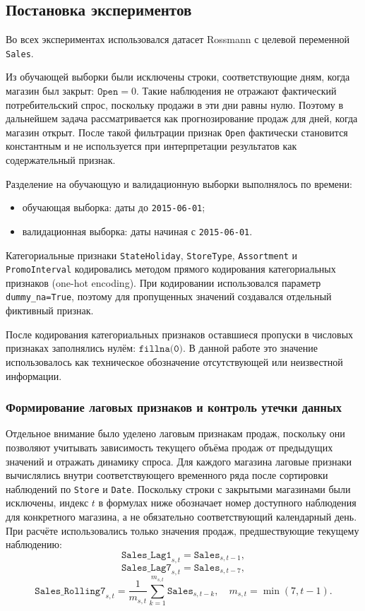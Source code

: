 \documentclass[12pt,a4paper]{article}
\numberwithin{equation}{section}
\begin{document}
\subsection{Постановка экспериментов}

Во всех экспериментах использовался датасет Rossmann с целевой переменной \texttt{Sales}.

Из обучающей выборки были исключены строки, соответствующие дням, когда магазин был закрыт: \(\texttt{Open} = 0\). Такие наблюдения не отражают фактический потребительский спрос, поскольку продажи в эти дни равны нулю. Поэтому в дальнейшем задача рассматривается как прогнозирование продаж для дней, когда магазин открыт. После такой фильтрации признак \texttt{Open} фактически становится константным и не используется при интерпретации результатов как содержательный признак.

Разделение на обучающую и валидационную выборки выполнялось по времени:

\begin{itemize}
    \item обучающая выборка: даты до \texttt{2015-06-01};
    \item валидационная выборка: даты начиная с \texttt{2015-06-01}.
\end{itemize}

Категориальные признаки \texttt{StateHoliday}, \texttt{StoreType}, \texttt{Assortment} и \texttt{PromoInterval} кодировались методом прямого кодирования категориальных признаков (one-hot encoding). При кодировании использовался параметр \texttt{dummy\_na=True}, поэтому для пропущенных значений создавался отдельный фиктивный признак.

После кодирования категориальных признаков оставшиеся пропуски в числовых признаках заполнялись нулём: \(\texttt{fillna(0)}\). В данной работе это значение использовалось как техническое обозначение отсутствующей или неизвестной информации.

\subsubsection{Формирование лаговых признаков и контроль утечки данных}

Отдельное внимание было уделено лаговым признакам продаж, поскольку они позволяют учитывать зависимость текущего объёма продаж от предыдущих значений и отражать динамику спроса. Для каждого магазина лаговые признаки вычислялись внутри соответствующего временного ряда после сортировки наблюдений по \texttt{Store} и \texttt{Date}. Поскольку строки с закрытыми магазинами были исключены, индекс \(t\) в формулах ниже обозначает номер доступного наблюдения для конкретного магазина, а не обязательно соответствующий календарный день. При расчёте использовались только значения продаж, предшествующие текущему наблюдению:
\[
\texttt{Sales\_Lag1}_{s,t} = \texttt{Sales}_{s,t-1},
\]
\[
\texttt{Sales\_Lag7}_{s,t} = \texttt{Sales}_{s,t-7},
\]
\[
\texttt{Sales\_Rolling7}_{s,t} =
\frac{1}{m_{s,t}}\sum_{k=1}^{m_{s,t}}\texttt{Sales}_{s,t-k},
\quad m_{s,t}=\min(7,t-1).
\]
\end{document}

